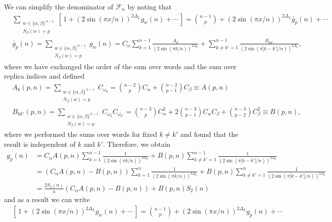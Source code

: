 \documentclass[11pt]{article}
\newcommand{\nn}{\nonumber}
\begin{document}
  We can simplify the denominator of $\mathcal{F}_{n}$ by noting that
  \begin{align}
     & \sum_{\substack{w\in\{\alpha,\beta\}^{\,n-1}\\ N_\beta(w)=p}}\left[\,1+(2\sin(\pi x/n))^{2\Delta_L}g_{w}(n)+\cdots\,\right]={n-1 \choose p}+(2\sin(\pi x/n))^{2\Delta_L}\bar{g}_{p}(n)+\cdots\,\nn                                   \\
     & \bar{g}_{p}(n) =\sum_{\substack{w\in\{\alpha,\beta\}^{\,n-1}\\ N_\beta(w)=p}}g_{w}(n)=C_{\alpha}\sum_{k=1}^{n-1}\frac{A_{k}}{(2\sin(\pi k/n))^{2\Delta_L}}+\sum_{k\neq k'=1}^{n-1}\frac{B_{kk'}}{(2\sin(\pi |k-k'|/n))^{2\Delta_L}},
  \end{align}
  where we have exchanged the order of the sum over words and the sum over
  replica indices and defined
  \begin{align}
     & A_{k}(p,n)=\sum_{\substack{w\in\{\alpha,\beta\}^{\,n-1}\\ N_\beta(w)=p}}C_{\omega_k}={n-2 \choose p}C_{\alpha}+{n-2 \choose p-1}C_{\beta}\equiv A(p,n)\nn                                                              \\
     & B_{kk'}(p,n)=\sum_{\substack{w\in\{\alpha,\beta\}^{\,n-1}\\ N_\beta(w)=p}}C_{\omega_k}C_{\omega_{k'}}={n-3 \choose p}C_{\alpha}^{2}+2{n-3 \choose p-1}C_{\alpha}C_{\beta}+{n-3 \choose p-2}C_{\beta}^{2}\equiv B(p,n), %
  \end{align}
  where we performed the sums over words for fixed $k\neq k'$ and found that the
  result is independent of $k$ and $k'$. Therefore, we obtain
  \begin{align}
    g_{p}(n) & =C_{\alpha}A(p,n)\sum_{k=1}^{n-1}\frac{1}{(2\sin(\pi k/n))^{2\Delta_L}}+B(p,n)\sum_{k\neq k'=1}^{n-1}\frac{1}{(2\sin(\pi |k-k'|/n))^{2\Delta_L}}\nn      \\
             & =(C_{\alpha}A(p,n)-B(p,n))\sum_{k=1}^{n}\frac{1}{(2\sin(\pi k/n))^{2\Delta_L}}+B(p,n)\sum_{k\neq k'=1}^{n}\frac{1}{(2\sin(\pi |k-k'|/n))^{2\Delta_L}}\nn \\
             & =\frac{2S_{2}(n)}{n}(C_{\alpha}A(p,n)-B(p,n))+B(p,n)S_{2}(n)\nn                                                                                          %
  \end{align}
  and as a result we can write
  \begin{align}
     & \left[\,1+(2\sin(\pi x/n))^{2\Delta_L}g_{w}(n)+\cdots\,\right]={n-1 \choose p}+(2\sin(\pi x/n))^{2\Delta_L}g_{p}(n)+\cdots\,
  \end{align}
\end{document}

